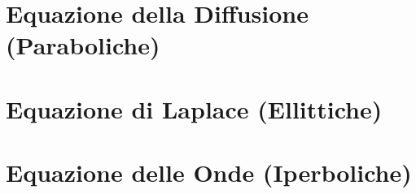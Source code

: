 \documentclass[a4paper]{report}
\begin{document}


\newpage
\tableofcontents
\newpage

\section{Equazione della Diffusione (Paraboliche)}	\label{sec:diffusion}


\section{Equazione di Laplace (Ellittiche)}	\label{sec:laplacian}


\section{Equazione delle Onde (Iperboliche)}	\label{sec:waves}


\listoffigures
\end{document}
